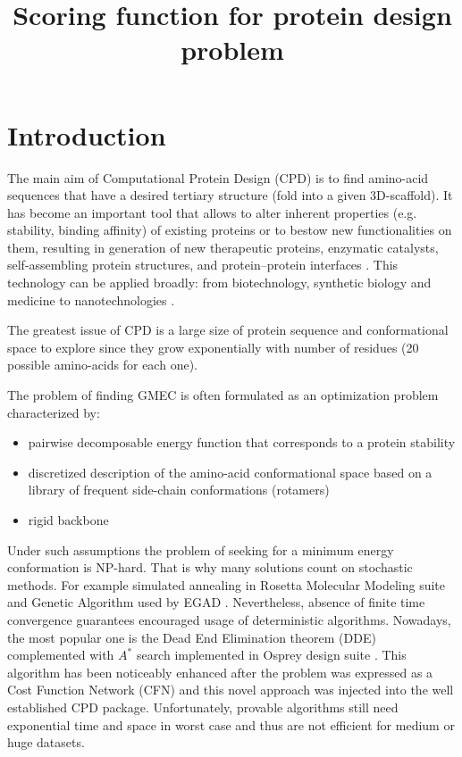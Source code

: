 \documentclass[12pt,twoside]{article}
\title
    [Scoring function for protein design problem] %
    {Scoring function for protein design problem}
\author
    {Author~A., Co-author~C., Co-author~C.} %
    [Author~A.$^1$, Co-author~C.$^2$, Co-author~C.$^2$] %
\begin{document}
\maketitle
\section{Introduction}
\bigskip
The main aim of Computational Protein Design (CPD) is
to find amino-acid sequences that have a desired tertiary
structure (fold into a given 3D-scaffold). It has become an important tool that allows to alter inherent properties (e.g. stability, binding affinity) of existing proteins or to bestow new functionalities on them, resulting in generation of new therapeutic proteins, enzymatic catalysts, self-assembling protein
structures, and protein–protein interfaces \cite{Chen:2009}. This technology can be applied broadly: from biotechnology, synthetic biology and medicine to nanotechnologies \cite{Palomo:2015}.

The greatest issue of CPD is a large size of protein sequence and conformational space to explore since they grow exponentially with number of residues (20 possible amino-acids for each one).

The problem of finding GMEC is often formulated as an optimization problem characterized by:
\begin{itemize}
\item pairwise decomposable energy function that corresponds to a protein stability
\item discretized description of the amino-acid conformational space based on a library of frequent side-chain conformations (rotamers)
\item rigid backbone
\end{itemize}
Under such assumptions the problem of seeking for a minimum energy conformation is NP-hard. That is why many solutions count on stochastic methods. For example simulated annealing in Rosetta Molecular Modeling suite \cite{Rosetta3} and Genetic Algorithm used by EGAD \cite{CPDlib}. Nevertheless, absence of finite time convergence guarantees encouraged usage of deterministic algorithms. Nowadays, the most popular one is the Dead End Elimination theorem (DDE) \cite{DDE:1992} complemented with $A^*$ search implemented in Osprey design suite  \cite{Osprey:2013}.
This algorithm has been noticeably enhanced after the problem was
expressed as a Cost Function Network (CFN) and this novel approach \cite{Traore:2016} was injected into the well established
CPD package. Unfortunately, provable algorithms still need exponential time and space in worst case and thus are not efficient for medium or huge datasets.
\bigskip
\end{document}
